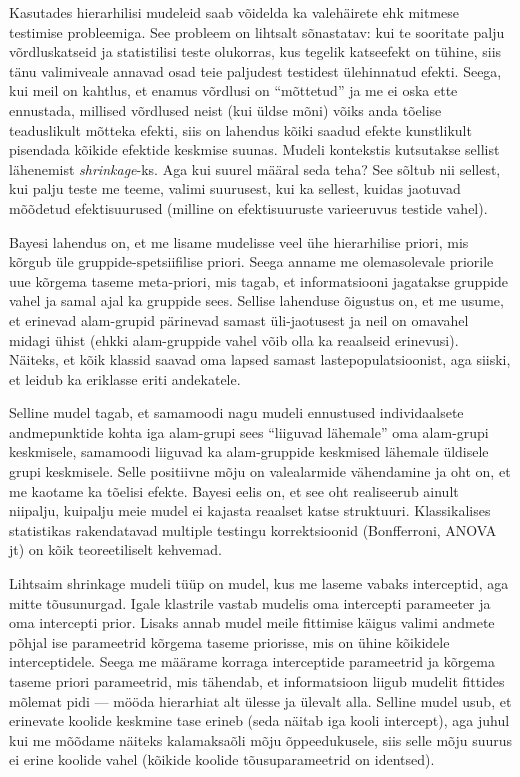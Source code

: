 \documentclass[]{book}
\begin{document}
Kasutades hierarhilisi mudeleid saab võidelda ka valehäirete ehk mitmese testimise probleemiga.
See probleem on lihtsalt sõnastatav: kui te sooritate palju võrdluskatseid ja statistilisi teste olukorras, kus tegelik katseefekt on tühine, siis tänu valimiveale annavad osad teie paljudest testidest ülehinnatud efekti.
Seega, kui meil on kahtlus, et enamus võrdlusi on ``mõttetud'' ja me ei oska ette ennustada, millised võrdlused neist (kui üldse mõni) võiks anda tõelise teaduslikult mõtteka efekti, siis on lahendus kõiki saadud efekte kunstlikult pisendada kõikide efektide keskmise suunas.
Mudeli kontekstis kutsutakse sellist lähenemist \emph{shrinkage}-ks.
Aga kui suurel määral seda teha?
See sõltub nii sellest, kui palju teste me teeme, valimi suurusest, kui ka sellest, kuidas jaotuvad mõõdetud efektisuurused (milline on efektisuuruste varieeruvus testide vahel).

Bayesi lahendus on, et me lisame mudelisse veel ühe hierarhilise priori, mis kõrgub üle gruppide-spetsiifilise priori.
Seega anname me olemasolevale priorile uue kõrgema taseme meta-priori, mis tagab, et informatsiooni jagatakse gruppide vahel ja samal ajal ka gruppide sees.
Sellise lahenduse õigustus on, et me usume, et erinevad alam-grupid pärinevad samast üli-jaotusest ja neil on omavahel midagi ühist (ehkki alam-gruppide vahel võib olla ka reaalseid erinevusi).
Näiteks, et kõik klassid saavad oma lapsed samast lastepopulatsioonist, aga siiski, et leidub ka eriklasse eriti andekatele.

Selline mudel tagab, et samamoodi nagu mudeli ennustused individaalsete andmepunktide kohta iga alam-grupi sees ``liiguvad lähemale'' oma alam-grupi keskmisele, samamoodi liiguvad ka alam-gruppide keskmised lähemale üldisele grupi keskmisele.
Selle positiivne mõju on valealarmide vähendamine ja oht on, et me kaotame ka tõelisi efekte.
Bayesi eelis on, et see oht realiseerub ainult niipalju, kuipalju meie mudel ei kajasta reaalset katse struktuuri. Klassikalises statistikas rakendatavad multiple testingu korrektsioonid (Bonfferroni, ANOVA jt) on kõik teoreetiliselt kehvemad.

Lihtsaim shrinkage mudeli tüüp on mudel, kus me laseme vabaks interceptid, aga mitte tõusunurgad.
Igale klastrile vastab mudelis oma intercepti parameeter ja oma intercepti prior. Lisaks annab mudel meile fittimise käigus valimi andmete põhjal ise parameetrid kõrgema taseme priorisse, mis on ühine kõikidele interceptidele.
Seega me määrame korraga interceptide parameetrid ja kõrgema taseme priori parameetrid, mis tähendab, et informatsioon liigub mudelit fittides mõlemat pidi --- mööda hierarhiat alt ülesse ja ülevalt alla.
Selline mudel usub, et erinevate koolide keskmine tase erineb (seda näitab iga kooli intercept), aga juhul kui me mõõdame näiteks kalamaksaõli mõju õppeedukusele, siis selle mõju suurus ei erine koolide vahel (kõikide koolide tõusuparameetrid on identsed).
\end{document}
